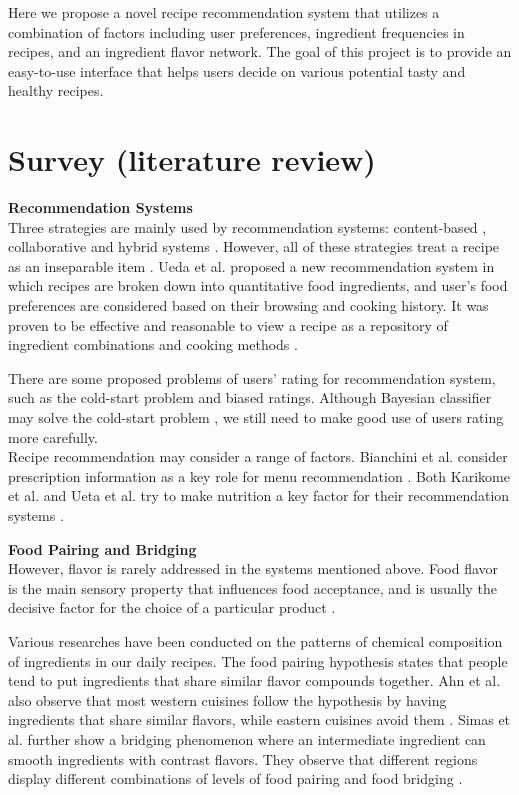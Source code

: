 \documentclass[sigconf]{acmart}
\begin{document}
Here we propose a novel recipe recommendation system that utilizes a combination of factors including user preferences, ingredient frequencies in recipes, and an ingredient flavor network. The goal of this project is to provide an easy-to-use interface that helps users decide on various potential tasty and healthy recipes.

\section{Survey (literature review)}
\textbf{Recommendation Systems}\\
Three strategies are mainly used by recommendation systems: content-based \cite{svensson2000recipe}, collaborative and hybrid systems \cite{sobecki2006application}. However, all of these strategies treat a recipe as an inseparable item \cite{freyne2010intelligent}. Ueda et al. proposed a new recommendation system in which recipes are broken down into quantitative food ingredients, and user's food preferences are considered based on their browsing and cooking history. It was proven to be effective and reasonable to view a recipe as a repository of ingredient combinations and cooking methods \cite{ueda2011user}\cite{ueda2014recipe}.

There are some proposed problems of users’ rating for recommendation system, such as the cold-start problem \cite{bobadilla2013recommender} and biased ratings\cite{rokicki2017editorial}. Although Bayesian classifier may solve the cold-start problem \cite{miyahara2000collaborative}, we still need to make good use of users rating more carefully.\\
\indent Recipe recommendation may consider a range of factors. Bianchini et al. consider prescription information as a key role for menu recommendation \cite{bianchini2017prefer}. Both Karikome et al. and Ueta et al. try to make nutrition a key factor for their recommendation systems \cite{karikome2010system}\cite{ueta2011recipe}.\\


\hfill \break

\noindent
\textbf{Food Pairing and Bridging}\\
However, flavor is rarely addressed in the systems mentioned above. Food flavor is the main sensory property that influences food acceptance, and is usually the decisive factor for the choice of a particular product \cite{jelen2011food}.

Various researches have been conducted on the patterns of chemical composition of ingredients in our daily recipes. The food pairing hypothesis states that people tend to put ingredients that share similar flavor compounds together. Ahn et al. also observe that most western cuisines follow the hypothesis by having ingredients that share similar flavors, while eastern cuisines avoid them \cite{ahn2011flavor}\cite{ahn2013flavor}. Simas et al. further show a bridging phenomenon where an intermediate ingredient can smooth ingredients with contrast flavors. They observe that different regions display different combinations of levels of food pairing and food bridging \cite{simas2017food}.
\end{document}
